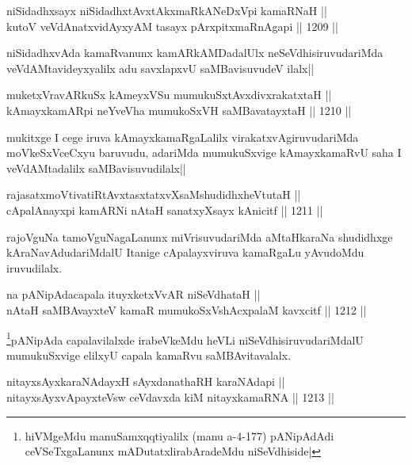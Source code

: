 \begin{shl}
niSidadhxsayx niSidadhxtAvxtAkxmaRkANeDxV\s pi kamaRNaH || \\
kutoV veVdAnatxvidAyxyAM tasayx pArxpitxmaRnAgapi ||  1209 ||  
\end{shl}

\begin{artha}
niSidadhxvAda kamaRvanunx kamARkAMDadalUlx neSeVdhisiruvudariMda veVdAMtavideyxyalilx adu savxlapxvU saMBavisuvudeV ilalx||
\end{artha}

\begin{shl}
muketxVravARkuSx kAmeyxVSu mumukuSxtAvxdivxrakatxtaH || \\
kAmayxkamARpi neYveVha mumukoSxVH saMBavatayxtaH ||  1210 ||  
\end{shl}

\begin{artha}
mukitxge I cege iruva kAmayxkamaRgaLalilx virakatxvAgiruvudariMda moVkeSxVceCxyu baruvudu, adariMda mumukuSxvige kAmayxkamaRvU saha I veVdAMtadalilx saMBavisuvudilalx||
\end{artha}

\begin{shl}
rajasatxmoVtivatiRtAvxtasxtatxvXsaMshudidhxheVtutaH || \\
cApalAnayxpi kamARNi nAtaH sanatxyXsayx kAnicitf ||  1211 ||  
\end{shl}

\begin{artha}
rajoVguNa tamoVguNagaLanunx miVrisuvudariMda aMtaHkaraNa shudidhxge kAraNavAdudariMdalU Itanige cApalayxviruva kamaRgaLu yAvudoMdu iruvudilalx.
\end{artha}

\begin{shl}
na pANipAdacapala ituyxketxVvAR niSeVdhataH || \\
nAtaH saMBAvayxteV kamaR mumukoSxVshAcxpalaM kavxcitf ||  1212 ||  
\end{shl}

\begin{artha}
\footnote{\stext hiVMgeMdu manuSamxqqtiyalilx (manu a-4-177) pANipAdAdi ceVSeTxgaLanunx mADutatxlirabAradeMdu niSeVdhiside|}pANipAda capalavilalxde irabeVkeMdu heVLi niSeVdhisiruvudariMdalU mumukuSxvige elilxyU capala kamaRvu saMBAvitavalalx.
\end{artha}

\begin{shl}
nitayxsAyxkaraNAdayxH sAyxdanathaRH karaNAdapi || \\
nitayxsAyxvApayxteV\s sw ceVdavxda kiM nitayxkamaRNA ||  1213 ||  
\end{shl}

